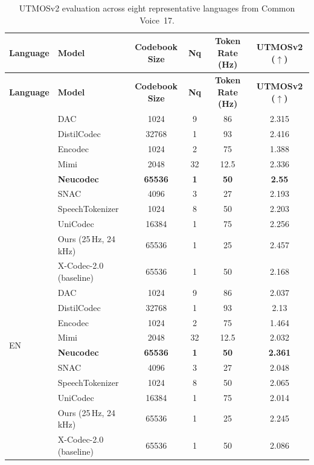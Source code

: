 \documentclass[preprint]{article}
\begin{document}
\begin{longtable}{llcccc}
\caption{UTMOSv2 evaluation across eight representative languages from Common Voice~17.}
\label{tab:utmos-comparison} \\
\toprule
\textbf{Language} & \textbf{Model} & \textbf{Codebook Size} & \textbf{Nq} & \textbf{Token Rate (Hz)} & \textbf{UTMOSv2 ($\uparrow$)} \\
\midrule
\endfirsthead

\toprule
\textbf{Language} & \textbf{Model} & \textbf{Codebook Size} & \textbf{Nq} & \textbf{Token Rate (Hz)} & \textbf{UTMOSv2 ($\uparrow$)} \\
\midrule
\endhead

\midrule
\endfoot

\bottomrule
\endlastfoot

\multirow{8}{*}{NL}
  & DAC & 1024 & 9 & 86 & 2.315 \\
  & DistilCodec & 32768 & 1 & 93 & 2.416 \\
  & Encodec & 1024 & 2 & 75 & 1.388 \\
  & Mimi & 2048 & 32 & 12.5 & 2.336 \\
  & \textbf{Neucodec} & \textbf{65536} & \textbf{1} & \textbf{50} & \textbf{2.55} \\
  & SNAC & 4096 & 3 & 27 & 2.193 \\
  & SpeechTokenizer & 1024 & 8 & 50 & 2.203 \\
  & UniCodec & 16384 & 1 & 75 & 2.256 \\
  & Ours (25\,Hz, 24\,kHz) & 65536 & 1 & 25 & 2.457 \\
  & X-Codec-2.0 (baseline) & 65536 & 1 & 50 & 2.168 \\
\midrule
\multirow{8}{*}{EN}
  & DAC & 1024 & 9 & 86 & 2.037 \\
  & DistilCodec & 32768 & 1 & 93 & 2.13 \\
  & Encodec & 1024 & 2 & 75 & 1.464 \\
  & Mimi & 2048 & 32 & 12.5 & 2.032 \\
  & \textbf{Neucodec} & \textbf{65536} & \textbf{1} & \textbf{50} & \textbf{2.361} \\
  & SNAC & 4096 & 3 & 27 & 2.048 \\
  & SpeechTokenizer & 1024 & 8 & 50 & 2.065 \\
  & UniCodec & 16384 & 1 & 75 & 2.014 \\
  & Ours (25\,Hz, 24\,kHz) & 65536 & 1 & 25 & 2.245 \\
  & X-Codec-2.0 (baseline) & 65536 & 1 & 50 & 2.086 \\

\end{longtable}
\end{document}
